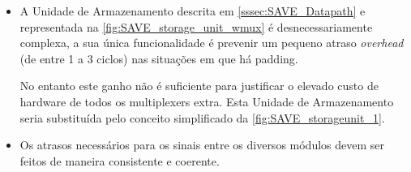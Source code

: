 \documentclass[a4paper]{article}
\begin{document}
\begin{itemize}
        \item A Unidade de Armazenamento descrita em \ref{sssec:SAVE_Datapath} e representada na \autoref{fig:SAVE_storage_unit_wmux} é desnecessariamente complexa, a sua única funcionalidade é prevenir um pequeno atraso \textit{overhead} (de entre 1 a 3 ciclos) nas situações em que há padding.

No entanto este ganho não é suficiente para justificar o elevado custo de hardware de todos os multiplexers extra. Esta Unidade de Armazenamento seria substituída pelo conceito simplificado da \autoref{fig:SAVE_storageunit_1}.

        \item Os atrasos necessários para os sinais entre os diversos módulos devem ser feitos de maneira consistente e coerente.

\end{itemize}
\end{document}

